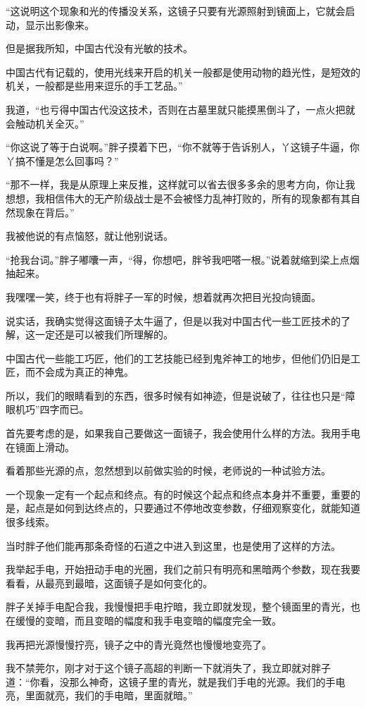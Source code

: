 “这说明这个现象和光的传播没关系，这镜子只要有光源照射到镜面上，它就会启动，显示出影像来。

但是据我所知，中国古代没有光敏的技术。

中国古代有记载的，使用光线来开启的机关一般都是使用动物的趋光性，是短效的机关，一般都是些用来逗乐的手工艺品。”

我道，“也亏得中国古代没这技术，否则在古墓里就只能摸黑倒斗了，一点火把就会触动机关全灭。”

“你这说了等于白说啊。”胖子摸着下巴，“你不就等于告诉别人，丫这镜子牛逼，你丫搞不懂是怎么回事吗？”

“那不一样，我是从原理上来反推，这样就可以省去很多多余的思考方向，你让我想想，我相信伟大的无产阶级战士是不会被怪力乱神打败的，所有的现象都有其自然现象在背后。”

我被他说的有点恼怒，就让他别说话。

“抢我台词。”胖子嘟囔一声，“得，你想吧，胖爷我吧嗒一根。”说着就缩到梁上点烟抽起来。

我嘿嘿一笑，终于也有将胖子一军的时候，想着就再次把目光投向镜面。

说实话，我确实觉得这面镜子太牛逼了，但是以我对中国古代一些工匠技术的了解，这一定还是可以被我们所理解的。

中国古代一些能工巧匠，他们的工艺技能已经到鬼斧神工的地步，但他们仍旧是工匠，而不会成为真正的神鬼。

所以，我们的眼睛看到的东西，很多时候有如神迹，但是说破了，往往也只是“障眼机巧”四字而已。

首先要考虑的是，如果我自己要做这一面镜子，我会使用什么样的方法。我用手电在镜面上滑动。

看着那些光源的点，忽然想到以前做实验的时候，老师说的一种试验方法。

一个现象一定有一个起点和终点。有的时候这个起点和终点本身并不重要，重要的是，起点是如何到达终点的，只要通过不停地改变参数，仔细观察变化，就能知道很多线索。

当时胖子他们能再那条奇怪的石道之中进入到这里，也是使用了这样的方法。

我举起手电，开始扭动手电的光圈，我们之前只有明亮和黑暗两个参数，现在我要看看，从最亮到最暗，这面镜子是如何变化的。

胖子关掉手电配合我，我慢慢把手电拧暗，我立即就发现，整个镜面里的青光，也在缓慢的变暗，而且变暗的幅度和我手电变暗的幅度完全一致。

我再把光源慢慢拧亮，镜子之中的青光竟然也慢慢地变亮了。

我不禁莞尔，刚才对于这个镜子高超的判断一下就消失了，我立即就对胖子道：“你看，没那么神奇，这镜子里的青光，就是我们手电的光源。我们的手电亮，里面就亮，我们的手电暗，里面就暗。”

